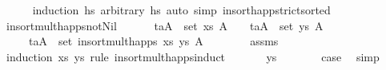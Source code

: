\begin{isabellebody}
%
\isadelimproof
\ \ \ \ %
\endisadelimproof
%
\isatagproof
{}\isamarkupfalse%
\ {\isacharparenleft}{\kern0pt}induction\ hs\ arbitrary{\isacharcolon}{\kern0pt}\ hs\ {\isacharparenleft}{\kern0pt}auto\ simp{\isacharcolon}{\kern0pt}\ insort{\isacharunderscore}{\kern0pt}happ{\isacharunderscore}{\kern0pt}strict{\isacharunderscore}{\kern0pt}sorted{\isacharparenright}{\kern0pt}%
\endisatagproof
{\isafoldproof}%
%
\isadelimproof
\isanewline
%
\endisadelimproof
\isanewline
\ \ \isamarkupfalse%
\ insort{\isacharunderscore}{\kern0pt}mult{\isacharunderscore}{\kern0pt}happs{\isacharunderscore}{\kern0pt}not{\isacharunderscore}{\kern0pt}Nil{\isacharcolon}{\kern0pt}\ \isanewline
\ \ \ \ \ {\isachardoublequoteopen}{\isasymforall}{\isacharparenleft}{\kern0pt}t\isactrlsub a{\isacharcomma}{\kern0pt}A{\isacharparenright}{\kern0pt}\ {\isasymin}\ set\ xs{\isachardot}{\kern0pt}\ A\ {\isasymnoteq}\ {\isacharbrackleft}{\kern0pt}{\isacharbrackright}{\kern0pt}{\isachardoublequoteclose}\ \ {\isachardoublequoteopen}{\isasymforall}{\isacharparenleft}{\kern0pt}t\isactrlsub a{\isacharcomma}{\kern0pt}A{\isacharparenright}{\kern0pt}\ {\isasymin}\ set\ ys{\isachardot}{\kern0pt}\ A\ {\isasymnoteq}\ {\isacharbrackleft}{\kern0pt}{\isacharbrackright}{\kern0pt}{\isachardoublequoteclose}\ \isanewline
\ \ \ \ \ {\isachardoublequoteopen}{\isasymforall}{\isacharparenleft}{\kern0pt}t\isactrlsub a{\isacharcomma}{\kern0pt}A{\isacharparenright}{\kern0pt}\ {\isasymin}\ set\ {\isacharparenleft}{\kern0pt}insort{\isacharunderscore}{\kern0pt}mult{\isacharunderscore}{\kern0pt}happs\ xs\ ys{\isacharparenright}{\kern0pt}{\isachardot}{\kern0pt}\ A\ {\isasymnoteq}\ {\isacharbrackleft}{\kern0pt}{\isacharbrackright}{\kern0pt}{\isachardoublequoteclose}\isanewline
%
\isadelimproof
\ \ \ \ %
\endisadelimproof
%
\isatagproof
{}\isamarkupfalse%
\ assms\isanewline
\ \ \isamarkupfalse%
\ {\isacharparenleft}{\kern0pt}induction\ xs\ ys\ rule{\isacharcolon}{\kern0pt}\ insort{\isacharunderscore}{\kern0pt}mult{\isacharunderscore}{\kern0pt}happs{\isachardot}{\kern0pt}induct{\isacharparenright}{\kern0pt}\isanewline
\ \ \ \ \isamarkupfalse%
\ {\isacharparenleft}{\kern0pt}{}\ ys{\isacharparenright}{\kern0pt}\isanewline
\ \ \ \ \isamarkupfalse%
\ \isamarkupfalse%
\ {\isacharquery}{\kern0pt}case\ \isamarkupfalse%
\ simp\isanewline

\end{isabellebody}
